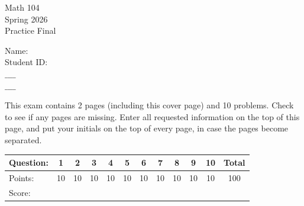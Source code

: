 \documentclass[10pt]{article}
\begin{document}
Math 104\\
Spring 2026\\
Practice Final

Name:\\
Student ID:\\
$\_\_\_\_$\\
$\_\_\_\_$

This exam contains 2 pages (including this cover page) and 10 problems. Check to see if any pages are missing. Enter all requested information on the top of this page, and put your initials on the top of every page, in case the pages become separated.

\begin{center}
\begin{tabular}{|l|c|c|c|c|c|c|c|c|c|c|c|}
\hline
Question: & 1 & 2 & 3 & 4 & 5 & 6 & 7 & 8 & 9 & 10 & Total \\
\hline
Points: & 10 & 10 & 10 & 10 & 10 & 10 & 10 & 10 & 10 & 10 & 100 \\
\hline
Score: &  &  &  &  &  &  &  &  &  &  &  \\
\hline
\end{tabular}
\end{center}
\end{document}

